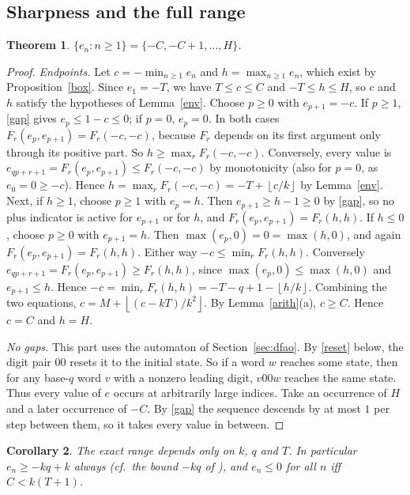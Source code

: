 \documentclass[11pt]{article}
\newtheorem{theorem}{Theorem}\newtheorem{lemma}[theorem]{Lemma}\newtheorem{proposition}[theorem]{Proposition}\newtheorem{corollary}[theorem]{Corollary}
\theoremstyle{remark}\newtheorem{remark}[theorem]{Remark}
\theoremstyle{definition}\newtheorem{definition}[theorem]{Definition}
\newcommand{\fl}[1]{\left\lfloor #1\right\rfloor}
\begin{document}
\subsection{Sharpness and the full range}
\begin{theorem}\label{range}
\(\{e_n:n\ge1\}=\{-C,-C+1,\dots,H\}\).
\end{theorem}
\begin{proof}
\emph{Endpoints.} Let \(c=-\min_{n\ge1}e_n\) and \(h=\max_{n\ge1}e_n\), which exist by Proposition~\ref{box}. Since \(e_1=-T\), we have \(T\le c\le C\) and \(-T\le h\le H\), so \(c\) and \(h\) satisfy the hypotheses of Lemma~\ref{env}.
Choose \(p\ge0\) with \(e_{p+1}=-c\). If \(p\ge1\), \eqref{gap} gives \(e_p\le1-c\le0\); if \(p=0\), \(e_p=0\). In both cases \(F_r(e_p,e_{p+1})=F_r(-c,-c)\), because \(F_r\) depends on its first argument only through its positive part. So \(h\ge\max_rF_r(-c,-c)\). Conversely, every value is \(e_{qp+r+1}=F_r(e_p,e_{p+1})\le F_r(-c,-c)\) by monotonicity (also for \(p=0\), as \(e_0=0\ge-c\)). Hence \(h=\max_rF_r(-c,-c)=-T+\fl{c/k}\) by Lemma~\ref{env}.
Next, if \(h\ge1\), choose \(p\ge1\) with \(e_p=h\). Then \(e_{p+1}\ge h-1\ge0\) by \eqref{gap}, so no plus indicator is active for \(e_{p+1}\) or for \(h\), and \(F_r(e_p,e_{p+1})=F_r(h,h)\). If \(h\le0\), choose \(p\ge0\) with \(e_{p+1}=h\). Then \(\max(e_p,0)=0=\max(h,0)\), and again \(F_r(e_p,e_{p+1})=F_r(h,h)\). Either way \(-c\le\min_rF_r(h,h)\). Conversely \(e_{qp+r+1}=F_r(e_p,e_{p+1})\ge F_r(h,h)\), since \(\max(e_p,0)\le\max(h,0)\) and \(e_{p+1}\le h\). Hence \(-c=\min_rF_r(h,h)=-T-q+1-\fl{h/k}\).
Combining the two equations, \(c=M+\fl{(c-kT)/k^2}\). By Lemma~\ref{arith}(a), \(c\ge C\). Hence \(c=C\) and \(h=H\).

\emph{No gaps.} This part uses the automaton of Section~\ref{sec:dfao}. By \eqref{reset} below, the digit pair \(00\) resets it to the initial state. So if a word \(w\) reaches some state, then for any base-\(q\) word \(v\) with a nonzero leading digit, \(v00w\) reaches the same state. Thus every value of \(e\) occurs at arbitrarily large indices. Take an occurrence of \(H\) and a later occurrence of \(-C\). By \eqref{gap} the sequence descends by at most \(1\) per step between them, so it takes every value in between.
\end{proof}

\begin{corollary}
The exact range depends only on \(k\), \(q\) and \(T\). In particular \(e_n\ge -kq+k\) always (cf.\ the bound \(-kq\) of \cite{cundric}), and \(e_n\le0\) for all \(n\) iff \(C<k(T+1)\).
\end{corollary}
\end{document}
